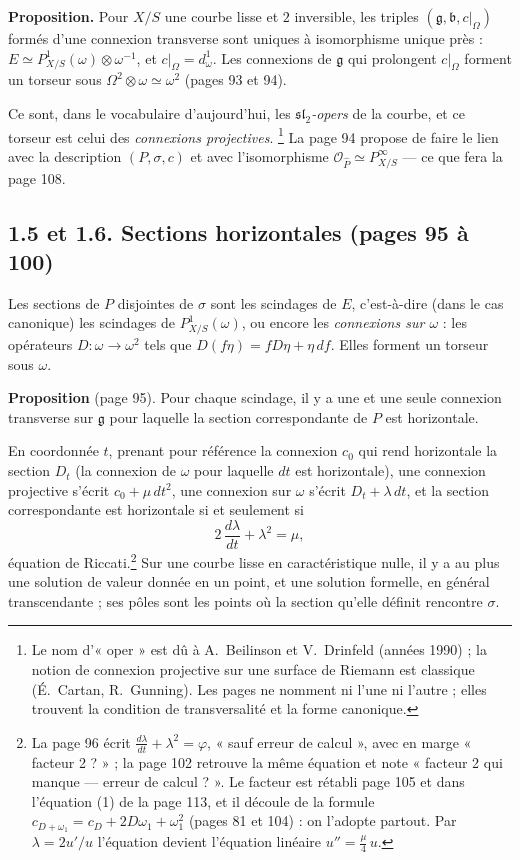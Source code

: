\documentclass[11pt,a4paper]{article}
\begin{document}
\textbf{Proposition.} Pour $X/S$ une courbe lisse et $2$ inversible, les
triples $(\mathfrak{g}, \mathfrak{b}, c|_\Omega)$ formés d'une connexion
transverse sont uniques à isomorphisme unique près : $E \simeq
P^1_{X/S}(\omega)\otimes\omega^{-1}$, et $c|_\Omega = d^1_\omega$. Les connexions
de $\mathfrak{g}$ qui prolongent $c|_\Omega$ forment un torseur sous
$\Omega^2 \otimes \omega \simeq \omega^{2}$ (pages 93 et 94).

Ce sont, dans le vocabulaire d'aujourd'hui, les \emph{$\mathfrak{sl}_2$-opers}
de la courbe, et ce torseur est celui des \emph{connexions projectives}.%
\footnote{Le nom d'« oper » est dû à A.~Beilinson et V.~Drinfeld (années
1990) ; la notion de connexion projective sur une surface de Riemann est
classique (É.~Cartan, R.~Gunning). Les pages ne nomment ni l'une ni
l'autre ; elles trouvent la condition de transversalité et la forme
canonique.}
La page 94 propose de faire le lien avec la description $(P, \sigma, c)$ et
avec l'isomorphisme $\mathcal{O}_{\hat P} \simeq P^\infty_{X/S}$ — ce que fera
la page 108.

\subsection*{1.5 et 1.6. Sections horizontales (pages 95 à 100)}

Les sections de $P$ disjointes de $\sigma$ sont les scindages de $E$,
c'est-à-dire (dans le cas canonique) les scindages de
$P^1_{X/S}(\omega)$, ou encore les \emph{connexions sur $\omega$} : les
opérateurs $D : \omega \to \omega^2$ tels que $D(f\eta) = fD\eta + \eta\,df$.
Elles forment un torseur sous $\omega$.

\textbf{Proposition} (page 95). Pour chaque scindage, il y a une et une seule
connexion transverse sur $\mathfrak{g}$ pour laquelle la section correspondante
de $P$ est horizontale.

En coordonnée $t$, prenant pour référence la connexion $c_0$ qui rend
horizontale la section $D_t$ (la connexion de $\omega$ pour laquelle $dt$ est
horizontale), une connexion projective s'écrit $c_0 + \mu\,dt^2$, une
connexion sur $\omega$ s'écrit $D_t + \lambda\,dt$, et la section
correspondante est horizontale si et seulement si
\[
  2\,\frac{d\lambda}{dt} + \lambda^2 = \mu ,
\]
équation de Riccati.\footnote{La page 96 écrit $\frac{d\lambda}{dt} + \lambda^2
= \varphi$, « sauf erreur de calcul », avec en marge « facteur 2 ? » ; la
page 102 retrouve la même équation et note « facteur 2 qui manque — erreur de
calcul ? ». Le facteur est rétabli page 105 et dans l'équation (1) de la page
113, et il découle de la formule $c_{D+\omega_1} = c_D + 2D\omega_1 +
\omega_1^2$ (pages 81 et 104) : on l'adopte partout. Par
$\lambda = 2u'/u$ l'équation devient l'équation linéaire $u'' =
\frac{\mu}{4}\,u$.} Sur une courbe lisse en caractéristique nulle, il y a au
plus une solution de valeur donnée en un point, et une solution formelle,
en général transcendante ; ses pôles sont les points où la section qu'elle
définit rencontre $\sigma$.
\end{document}
